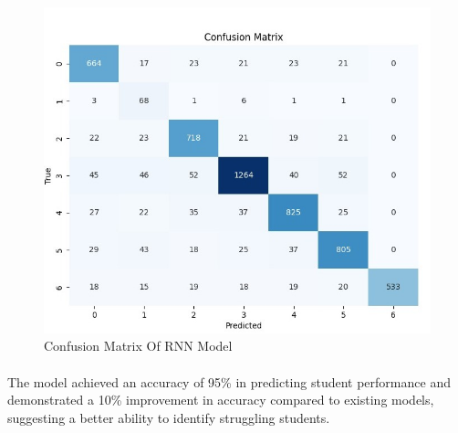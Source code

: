 \begin{figure}[!ht]
\centering
\includegraphics[width=125mm]{rnn conf.jpeg}
\caption{Confusion Matrix Of RNN Model}
\end{figure} 

\paragraph{} The model achieved an accuracy of 95\% in predicting student performance and demonstrated a 10\% improvement in accuracy compared to existing models, suggesting a better ability to identify struggling students.



